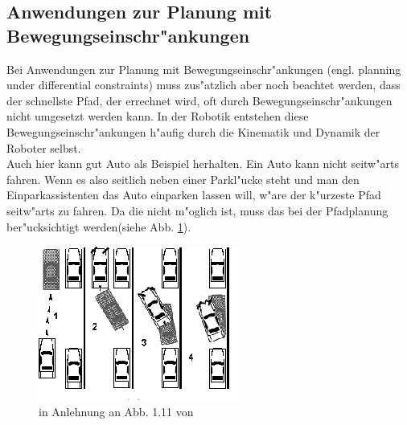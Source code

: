 \subsection{Anwendungen zur Planung mit Bewegungseinschr"ankungen}
Bei Anwendungen zur Planung mit Bewegungseinschr"ankungen (engl. planning under differential constraints) muss zus"atzlich aber noch beachtet werden, dass der schnellste Pfad, der errechnet wird, oft durch Bewegungseinschr"ankungen nicht umgesetzt werden kann. In der Robotik entstehen diese Bewegungseinschr"ankungen h"aufig durch die Kinematik und Dynamik der Roboter selbst.\\
Auch hier kann gut Auto als Beispiel herhalten. Ein Auto kann nicht seitw"arts fahren. Wenn es also seitlich neben einer Parkl"ucke steht und man den Einparkassistenten das Auto einparken lassen will, w"are der k"urzeste Pfad seitw"arts zu fahren. Da die nicht m"oglich ist, muss das bei der Pfadplanung ber"ucksichtigt werden(siehe Abb. \ref{Abb. 5.3}).
\begin{figure}
	\centering
	\includegraphics[width=0.5\linewidth]{images/img239}
	\caption{in Anlehnung an Abb. 1.11 von \cite[~S. 15]{Lav06}}
	\label{Abb. 5.3}
\end{figure}

